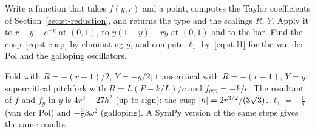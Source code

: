 \label{exo:st-computer-normal}
%
Write a function that takes $f(y,r)$ and a point, computes the Taylor coefficients
of Section~\ref{sec:st-reduction}, and returns the type and the scalings $R$, $Y$.
Apply it to $r - y - e^{-y}$ at $(0,1)$, to $y(1-y) - ry$ at $(0,1)$ and to the bar.
Find the cusp~\eqref{eq:st-cusp} by eliminating $y$, and compute $\ell_1$
by~\eqref{eq:st-l1} for the van der Pol and the galloping oscillators.
\begin{solution}
Fold with $R = -(r-1)/2$, $Y = -y/2$; transcritical with $R = -(r-1)$, $Y = y$;
supercritical pitchfork with $R = L(P - k/L)/c$ and $f_{\theta\theta\theta} = -k/c$.
The resultant of $f$ and $f_y$ in $y$ is $4r^3 - 27h^2$ (up to sign): the cusp
$\lvert h\rvert = 2r^{3/2}/(3\sqrt3)$. $\ell_1 = -\tfrac18$ (van der Pol) and
$-\tfrac38\beta\omega^2$ (galloping). A SymPy version of the same steps gives the same
results.

\end{solution}

